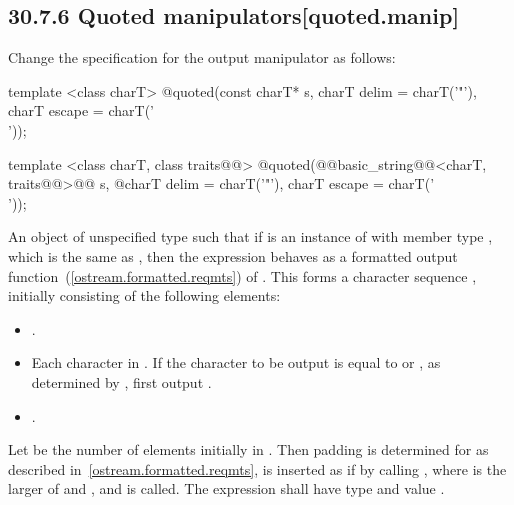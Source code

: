\documentclass[ebook,11pt,article]{memoir}
\begin{document}
\subsection{30.7.6 Quoted manipulators[quoted.manip]}
Change the specification for the output manipulator as follows:
\begin{removedblock}
\begin{itemdecl}
template <class charT>
  @\unspec@ quoted(const charT* s, charT delim = charT('"'), charT escape = charT('\\'));
\end{itemdecl}
\end{removedblock}
\begin{itemdecl}
template <class charT, class traits@@>
  @\unspec@ quoted(@@basic_string@@<charT, traits@@>@\removed{\&}@ s,
  @\itcorr@                   charT delim = charT('"'), charT escape = charT('\\'));
\end{itemdecl}

\begin{itemdescr}
\pnum
\returns An object of unspecified type such that if  is an instance
of  with member type , which is the same as , then the expression
behaves as a formatted output function~(\ref{ostream.formatted.reqmts})
of . This forms a character sequence , initially
consisting of the following elements:
\begin{itemize}
\item {}.
\item Each character in . If the character to be output is equal to
 or , as determined by , first
output .
\item {}.
\end{itemize}
Let  be the number of elements initially in .
Then padding is determined for  as described
in~\ref{ostream.formatted.reqmts},  is inserted as if by calling
, where  is the larger of
 and , and  is called.
The expression  shall have type
 and value .
\end{itemdescr}
\end{document}
